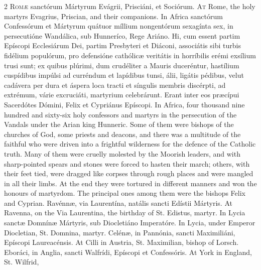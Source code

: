 \begin{paracol}{2}
\lettrine[lines=2]{R}{omæ} sanctórum Mártyrum 
 Evágrii, Prisciáni, et Sociórum.
\switchcolumn
{}
\lettrine[lines=2]{A}{t} Rome, the holy martyrs Evagrius, 
 Priscian, and their companions.
\switchcolumn*
{}
In Africa sanctórum 
 Confessórum et Mártyrum quátuor míllium nongentórum sexagínta sex, in 
 persecutióne Wandálica, sub Hunneríco, Rege Ariáno. Hi, cum essent 
 partim Epíscopi Ecclesiárum Dei, partim Presbyteri et Diáconi, associátis 
 sibi turbis fidélium populórum, pro defensióne cathólicæ veritátis in 
 horríbilis erémi exsílium trusi sunt; ex quibus plúrimi, dum crudéliter a 
 Mauris duceréntur, hastílium cuspídibus impúlsi ad curréndum et lapídibus 
 tunsi, álii, ligátis pédibus, velut cadávera per dura et áspera loca tracti 
 et síngulis membris discérpti, ad extrémum, várie excruciáti, martyrium 
 celebrárunt. Erant inter eos præcípui Sacerdótes Dómini, Felix et 
 Cypriánus Epíscopi.
\switchcolumn
{}
In Africa, four thousand nine 
 hundred and sixty-six holy confessors and martyrs in the persecution of the 
 Vandals under the Arian king Hunneric. Some of them were bishops of 
 the churches of God, some priests and deacons, and there was a multitude of 
 the faithful who were driven into a frightful wilderness for the defence of 
 the Catholic truth. Many of them were cruelly molested by the Moorish 
 leaders, and with sharp-pointed spears and stones were forced to hasten 
 their march; others, with their feet tied, were dragged like corpses through 
 rough places and were mangled in all their limbs. At the end they were 
 tortured in different manners and won the honours of martyrdom. The 
 principal ones among them were the bishops Felix and Cyprian.
\switchcolumn*
{}
Ravénnæ, via Laurentína, natális sancti Edístii Mártyris.
\switchcolumn
{}
At Ravenna, on the Via Laurentina, 
 the birthday of St. Edistus, martyr.
\switchcolumn*
{}
In Lycia sanctæ Domnínæ 
 Mártyris, sub Diocletiáno Imperatóre.
\switchcolumn
{}
In Lycia, under Emperor Diocletian, 
 St. Domnina, martyr.
\switchcolumn*
{}
Celénæ, in Pannónia, 
 sancti Maximiliáni, Epíscopi Laureacénsis.
\switchcolumn
{}
At Cilli in Austria, St. Maximilian, 
 bishop of Lorsch.
\switchcolumn*
{}
Eboráci, in Anglia, 
 sancti Walfrídi, Epíscopi et Confessóris.
\switchcolumn
{}
At York in England, St. Wilfrid, 

\end{paracol}
